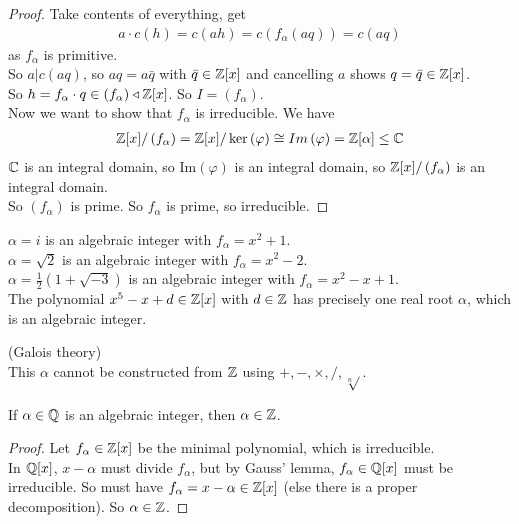 \documentclass[a4paper]{article}
\begin{document}
\begin{prop}
\begin{proof}
Take contents of everything, get
\begin{equation*}
\begin{aligned}
a\cdot c\left(h\right) = c\left(ah\right) = c\left(f_\alpha\left(aq\right)\right) = c\left(aq\right)
\end{aligned}
\end{equation*}
as $f_\alpha$ is primitive.\\
So $a|c\left(aq\right)$, so $aq = a \bar{q}$ with $\bar{q}\in\mathbb{Z}[x]$ and cancelling $a$ shows $q=\bar{q}\in \mathbb{Z}[x]$.\\
So $h=f_\alpha \cdot q\in\left(f_\alpha\right) \triangleleft \mathbb{Z}[x]$. So $I=\left(f_\alpha\right)$.\\

Now we want to show that $f_\alpha$ is irreducible. We have
\begin{equation*}
\begin{aligned}
\mathbb{Z}[x]/\left(f_\alpha\right) = \mathbb{Z}[x]/\ker\left(\varphi\right) \cong Im\left(\varphi\right) = \mathbb{Z}[\alpha] \leq \mathbb{C}
\end{aligned}
\end{equation*}
$\mathbb{C}$ is an integral domain, so Im$\left(\varphi\right)$ is an integral domain, so $\mathbb{Z}[x]/\left(f_\alpha\right)$ is an integral domain.\\
So $\left(f_\alpha\right)$ is prime. So $f_\alpha$ is prime, so irreducible.
\end{proof}
\end{prop}

\begin{eg}
$\alpha = i$ is an algebraic integer with $f_\alpha = x^2 + 1$.\\
$\alpha = \sqrt{2}$ is an algebraic integer with $f_\alpha = x^2-2$.\\
$\alpha = \frac{1}{2}\left(1+\sqrt{-3}\right)$ is an algebraic integer with $f_\alpha = x^2-x+1$.\\
The polynomial $x^5 - x + d\in\mathbb{Z}[x]$ with $d\in \mathbb{Z}$ has precisely one real root $\alpha$, which is an algebraic integer.
\end{eg}
\begin{rem} (Galois theory)\\
This $\alpha$ cannot be constructed from $\mathbb{Z}$ using $+,-,\times,/,\sqrt[n]{ }$.
\end{rem}

\begin{lemma}
If $\alpha\in\mathbb{Q}$ is an algebraic integer, then $\alpha \in \mathbb{Z}$.
\begin{proof}
Let $f_\alpha \in \mathbb{Z}[x]$ be the minimal polynomial, which is irreducible.\\
In $\mathbb{Q}[x]$, $x-\alpha$ must divide $f_\alpha$, but by Gauss' lemma, $f_\alpha \in \mathbb{Q}[x]$ must be irreducible. So must have $f_\alpha = x-\alpha\in\mathbb{Z}[x]$ (else there is a proper decomposition). So $\alpha \in \mathbb{Z}$.
\end{proof}
\end{lemma}
\end{document}
